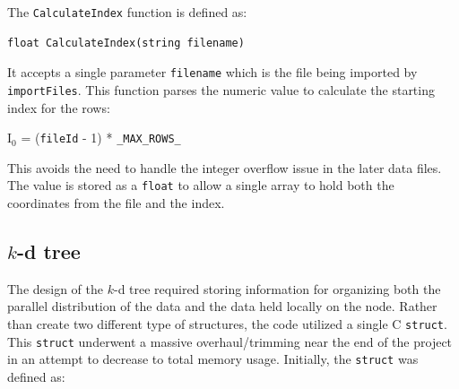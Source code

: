 \documentclass{article}
\begin{document}
The \texttt{CalculateIndex} function is defined as:

\begin{minipage}{\linewidth}
\lstset{language=C++, keepspaces=true}
\begin{lstlisting}
float CalculateIndex(string filename)
\end{lstlisting}
\end{minipage}

It accepts a single parameter \texttt{filename} which is the file being imported by \texttt{importFiles}. This function parses the numeric value to calculate the starting index for the rows:

\begin{center}
    I$_0$ = (\texttt{fileId} - 1) * \texttt{\_MAX\_ROWS\_}
\end{center}

This avoids the need to handle the integer overflow issue in the later data files. The value is stored as a \texttt{float} to allow a single array to hold both the coordinates from the file and the index.




%
%

\subsection{$k$-d tree}
%
%

The design of the $k$-d tree required storing information for organizing both the parallel distribution of the data and the data held locally on the node. Rather than create two different type of structures, the code utilized a single C \texttt{struct}. This \texttt{struct} underwent a massive overhaul/trimming near the end of the project in an attempt to decrease to total memory usage. Initially, the \texttt{struct} was defined as:
\end{document}
